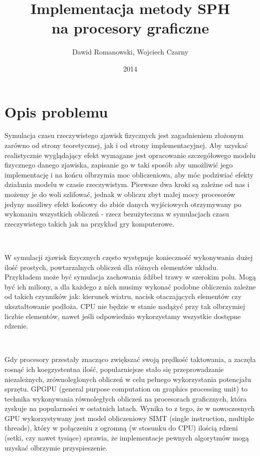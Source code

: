 \documentclass[polish, 12pt]{aghthesis}
\author{Dawid Romanowski, Wojciech Czarny}
\title{Implementacja metody SPH \\ na procesory graficzne}
\date{2014}
\begin{document}
\maketitle{}

\tableofcontents
\clearpage



\section{Opis problemu}

	Symulacja czasu rzeczywistego zjawisk fizycznych jest zagadnieniem złożonym zarówno od strony teoretycznej, jak i od strony implementacyjnej. Aby uzyskać realistycznie wyglądający efekt wymagane jest opracowanie szczegółowego modelu fizycznego danego zjawiska, zapisanie go w taki sposób aby umożliwić jego implementację i na końcu olbrzymia moc obliczeniowa, aby móc podziwiać efekty działania modelu w czasie rzeczywistym. Pierwsze dwa kroki są zależne od nas i możemy je do woli szlifować, jednak w obliczu zbyt małej mocy procesorów jedyny możliwy efekt końcowy do zbiór danych wyjściowych otrzymywany po wykonaniu wszystkich obliczeń - rzecz bezużyteczna w symulacjach czasu rzeczywistego takich jak na przykład gry komputerowe.
	
	$\,$

	W symulacji zjawisk fizycznych często występuje konieczność wykonywania dużej ilość prostych, powtarzalnych obliczeń dla różnych elementów układu. Przykładem może być symulacja zachowania źdźbeł trawy w szerokim polu. Mogą być ich miliony, a dla każdego z nich musimy wykonać podobne obliczenia zależne od takich czynników jak: kierunek wiatru, nacisk otaczających elementów czy ukształtowanie podłoża. CPU nie będzie w stanie nadążyć przy tak olbrzymiej liczbie elementów, nawet jeśli odpowiednio wykorzystamy wszystkie dostępne rdzenie. 
	
	$\,$

		Gdy procesory przestały znacząco zwiększać swoją prędkość taktowania, a zaczęła rosnąć ich koegzystentna ilość, popularniejsze stało się przeprowadzanie niezależnych, zrównoleglonych obliczeń w celu pełnego wykorzystania potencjału sprzętu. GPGPU (general purpose computation on graphics processing unit) to technika wykonywania równoległych obliczeń na procesorach graficznych, która zyskuje na popularności w ostatnich latach. Wynika to z tego, że w nowoczesnych GPU wykorzystywany jest model obliczeniowy SIMT (single instruction, multiple threads), który w połączeniu z ogromną (w stosunku do CPU) ilością rdzeni (setki, czy nawet tysiące) sprawia, że implementacje pewnych algorytmów mogą uzyskać olbrzymie przyspieszenie.
		
\end{document}
